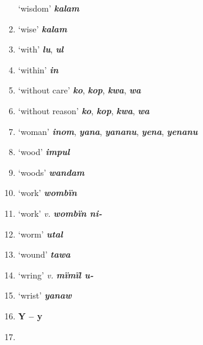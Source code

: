 \begin{enumerate}[noitemsep, label={}, align=left, widest=190, labelsep=1ex,leftmargin=*,itemindent=-10pt]
‘wisdom’ \textbf{\textit{kalam}} \item
‘wise’ \textbf{\textit{kalam}} \item
‘with’ \textbf{\textit{lu}}, \textbf{\textit{ul}} \item
‘within’ \textbf{\textit{in}} \item
‘without care’ \textbf{\textit{ko}}, \textbf{\textit{kop}}, \textbf{\textit{kwa}}, \textbf{\textit{wa}} \item
‘without reason’ \textbf{\textit{ko}}, \textbf{\textit{kop}}, \textbf{\textit{kwa}}, \textbf{\textit{wa}} \item
‘woman’ \textbf{\textit{inom}}, \textbf{\textit{yana}}, \textbf{\textit{yananu}}, \textbf{\textit{yena}}, \textbf{\textit{yenanu}} \item
‘wood’ \textbf{\textit{impul}} \item
‘woods’ \textbf{\textit{wandam}} \item
‘work’ \textbf{\textit{wombïn}} \item
‘work’ \textit{v.} \textbf{\textit{wombïn ni-}} \item
‘worm’ \textbf{\textit{utal}} \item
‘wound’ \textbf{\textit{tawa}} \item
‘wring’ \textit{v.} \textbf{\textit{mïmïl u-}} \item
‘wrist’ \textbf{\textit{yanaw}}\\ \item

\noindent \textbf{Y – y}\\ \item


\end{enumerate}
